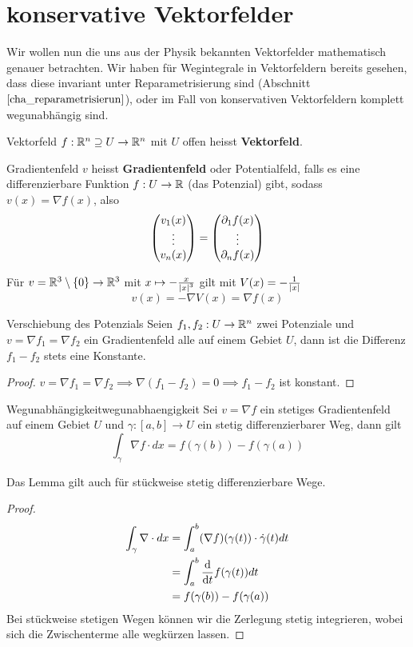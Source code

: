 \section{konservative Vektorfelder}
Wir wollen nun die uns aus der Physik bekannten Vektorfelder mathematisch genauer betrachten. Wir haben für Wegintegrale in Vektorfeldern bereits gesehen, dass diese invariant unter Reparametrisierung sind (Abschnitt $\ref{cha_reparametrisierun}$), oder im Fall von konservativen Vektorfeldern komplett wegunabhängig sind.
\begin{definition}{Vektorfeld}{}
$f: \mathbb{R}^n \supseteq U \to \mathbb{R}^n$ mit $U$ offen heisst \textbf{Vektorfeld}.
\end{definition}
\begin{definition}{Gradientenfeld}{}
$v$ heisst \textbf{Gradientenfeld} oder Potentialfeld, falls es eine differenzierbare Funktion $f: U \to \mathbb{R}$ (das Potenzial) gibt, sodass $v(x) = \nabla f(x)$, also 
$$\begin{pmatrix}v_1(x)\\\vdots\\v_n(x)\end{pmatrix} = \begin{pmatrix}\partial_1f(x)\\\vdots\\\partial_nf(x)\end{pmatrix}$$
\end{definition}
\begin{example}[Gravitationsfeld] Für $v=\mathbb{R}^3\setminus \{0\} \to \mathbb{R}^3$ mit $x \mapsto -\frac{x}{\left|x\right|^3}$ gilt mit $V(x) = -\frac{1}{\left|x\right|}$
$$v(x) = -\nabla V(x) = \nabla f(x)$$
\end{example}
\begin{lemma}{Verschiebung des Potenzials}{}
Seien $f_1, f_2: U \to \mathbb{R}^n$ zwei Potenziale und $v = \nabla f_1 = \nabla f_2$ ein Gradientenfeld alle auf einem Gebiet $U$, dann ist die Differenz $f_1-f_2$ stets eine Konstante.
\end{lemma}
\begin{proof}
$v = \nabla f_1 = \nabla f_2 \implies \nabla(f_1-f_2) = 0 \implies f_1 - f_2$ ist konstant.
\end{proof}
\begin{lemma}{Wegunabhängigkeit}{wegunabhaengigkeit}
Sei $v = \nabla f$ ein stetiges Gradientenfeld auf einem Gebiet $U$ und $\gamma:[a,b] \to U$ ein stetig differenzierbarer Weg, dann gilt
$$\int_\gamma \nabla f \cdot dx = f(\gamma(b))- f(\gamma(a))$$

Das Lemma gilt auch für stückweise stetig differenzierbare Wege.
\end{lemma}
\begin{proof}
\begin{align*}
    \int_\gamma \nabla \cdot dx &= \int_a^b (\nabla f)(\gamma(t))\cdot\Dot{\gamma}(t)dt\\
    &= \int_a^b\diff{}{t}f(\gamma(t))dt\\
    &= f(\gamma(b)) - f(\gamma(a))
\end{align*}
Bei stückweise stetigen Wegen können wir die Zerlegung stetig integrieren, wobei sich die Zwischenterme alle wegkürzen lassen.
\end{proof}

